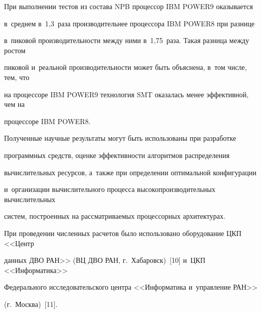 При выполнении тестов из состава NPB процессор IBM POWER9 оказывается 


в~среднем в~1,3~раза производительнее процессора IBM POWER8 при разнице 


в~пиковой производительности между ними в~1,75~раза. Такая разница между ростом 


пиковой и~реальной производительности может быть объяснена, в~том числе, тем, что 


на процессоре IBM \mbox{POWER9} технология SMT оказалась менее эффективной, чем на 


процессоре IBM \mbox{POWER8}.





Полученные научные результаты могут быть использованы при разработке 


программных средств, оценке эффективности алгоритмов распределения 


вы\-чис\-ли\-тель\-ных ресурсов, а~также при определении оптимальной конфигурации 


и~организации вычислительного процесса высокопроизводительных вычислительных 


систем, построенных на рассматриваемых процессорных архитектурах.





При проведении численных расчетов было использовано оборудование ЦКП <<Центр 


данных ДВО РАН>> (ВЦ ДВО РАН, г.~Хабаровск)~[10] и~ЦКП <<Информатика>> 


Федерального исследовательского центра <<Информатика и~управ\-ле\-ние РАН>> 


(г.~Москва)~[11].





